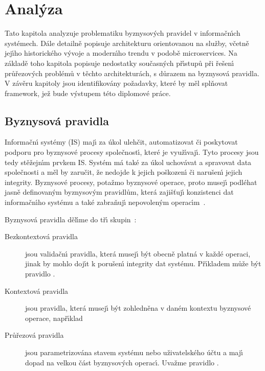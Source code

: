 
\chapter{Anal\'yza}\label{ch:analyza}

Tato kapitola analyzuje problematiku byznysov\'ych pravidel v informačn\'{\i}ch systémech.
Dále detailně popisuje architekturu orientovanou na služby, včetně jej\'{\i}ho historického
v\'yvoje a modern\'{\i}ho trendu v podobě microservices. Na základě toho kapitola popisuje nedostatky
současn\'ych př\'{\i}stupů při řešen\'{\i} průřezov\'ych problémů v těchto architekturách, s důrazem na byznysová pravidla.
V závěru kapitoly jsou identifikovány požadavky, které by měl splňovat framework,
jež bude v\'ystupem této diplomové práce.

\section{Byznysová pravidla}

Informačn\'{\i} systémy (\gls{IS}) maj\'{\i} za úkol ulehčit, automatizovat či poskytovat podporu pro
byznysové procesy společnost\'{\i}, které je využ\'{\i}vaj\'{\i}. Tyto procesy jsou tedy stěžejn\'{\i}m
prvkem \gls{IS}. Systém má také za úkol uchovávat a spravovat data společnosti
a měl by zaručit, že nedojde k jejich poškozen\'{\i} či narušen\'{\i} jejich integrity.
Byznysové procesy, potažmo byznysové operace, proto musej\'{\i}
podléhat jasně definovan\'ym byznysov\'ym pravidlům, která zajišťuj\'{\i} konzistenci dat informačn\'{\i}ho
systému a také zabraňuj\'{\i} nepovolen\'ym operac\'{\i}m~\cite{cemus2015automated}.

Byznysová pravidla děl\'{\i}me do tř\'{\i} skupin~\cite{cemus2014aspect}:
\begin{description}
    \item [Bezkontextová pravidla] jsou validačn\'{\i} pravidla, která musej\'{\i} b\'yt obecně platná
    v každé operaci, jinak by mohlo doj\'{\i}t k porušen\'{\i} integrity dat systému. Př\'{\i}kladem může
    b\'yt pravidlo .
    \item [Kontextová pravidla] jsou pravidla, která musej\'{\i} b\'yt zohledněna v daném kontextu
    byznysové operace, např\'{\i}klad 
    \item [Průřezová pravidla] jsou parametrizována stavem systému nebo uživatelského účtu a maj\'{\i}
    dopad na velkou část byznysov\'ych operac\'{\i}. Uvažme pravidlo .
\end{description}

